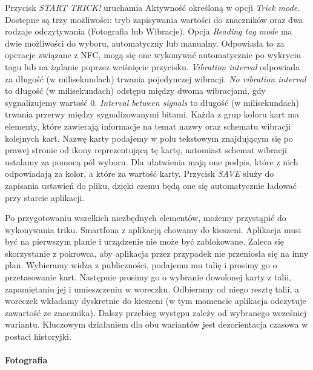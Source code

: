 Przycisk \textit{START TRICK!} uruchamia Aktywność określoną w opcji \textit{Trick mode}. Dostepne są trzy możliwości: tryb zapisywania wartości do znaczników oraz dwa rodzaje odczytywania (Fotografia lub Wibracje). Opcja \textit{Reading tag mode} ma dwie możliwości do wyboru, automatyczny lub manualny. Odpowiada to za operacje związane z NFC, mogą się one wykonywać automatycznie po wykryciu tagu lub na żądanie poprzez wciśnięcie przycisku. \textit{Vibration interval} odpowiada za długość (w milisekundach) trwania pojedynczej wibracji. \textit{No vibration interval} to długość (w milisekundach) odstępu między dwoma wibracjami, gdy sygnalizujemy wartość 0. \textit{Interval between signals} to długość (w milisekundach) trwania przerwy między sygnalizowanymi bitami. Każda z grup koloru kart ma elementy, które zawierają informacje na temat nazwy oraz schematu wibracji kolejnych kart. Nazwę karty podajemy w polu tekstowym znajdującym się po prawej stronie od ikony reprezentującą tę kartę, natomiast schemat wibracji ustalamy za pomocą pól wyboru. Dla ułatwienia mają one podpis, które z nich odpowiadają za kolor, a które za wartość karty. Przycisk \textit{SAVE} służy do zapisania ustawień do pliku, dzięki czemu będą one się automatycznie ładować przy starcie aplikacji. 
\par
Po przygotowaniu wszelkich niezbędnych elementów, możemy przystąpić do wykonywania triku. Smartfona z aplikacją chowamy do kieszeni. Aplikacja musi być na pierwszym planie i urządzenie nie może być zablokowane. Zaleca się skorzystanie z pokrowca, aby aplikacja przez przypadek nie przeniosła się na inny plan. Wybieramy widza z publiczności, podajemu mu talię i prosimy go o przetasowanie kart. Następnie prosimy go o wybranie dowolonej karty z talii, zapamiętaniu jej i umieszczeniu w woreczku. Odbieramy od niego resztę talii, a woreczek wkładamy dyskretnie do kieszeni (w tym momencie aplikacja odczytuje zawartość ze znacznika). Dalszy przebieg występu zależy od wybranego wcześniej wariantu. Kluczowym działaniem dla obu wariantów jest dezorientacja czasowa w postaci historyjki.
\paragraph{Fotografia}\mbox{}\\


